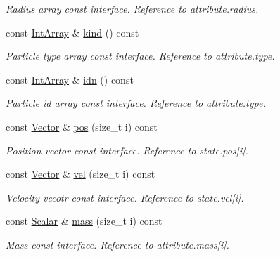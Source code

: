 \begin{DoxyCompactItemize}
\begin{DoxyCompactList}\small\item\em Radius array const interface. Reference to attribute.\+radius. \end{DoxyCompactList}\item 
const \mbox{\hyperlink{classparticle_system_aea9c70dc1a9d1947b425f5383fb21e24}{Int\+Array}} \& \mbox{\hyperlink{classparticle_system_a5b41ae458724a13976117216fdf63b19}{kind}} () const
\begin{DoxyCompactList}\small\item\em Particle type array const interface. Reference to attribute.\+type. \end{DoxyCompactList}\item 
const \mbox{\hyperlink{classparticle_system_aea9c70dc1a9d1947b425f5383fb21e24}{Int\+Array}} \& \mbox{\hyperlink{classparticle_system_a551d6833ec7b1f42a0d2c6b8ad0b3ddb}{idn}} () const
\begin{DoxyCompactList}\small\item\em Particle id array const interface. Reference to attribute.\+type. \end{DoxyCompactList}\item 
const \mbox{\hyperlink{classparticle_system_a76c99c2b05db108a24c6e6ccbbd93af1}{Vector}} \& \mbox{\hyperlink{classparticle_system_ae18ea167d5145d52067ae6661a416c4c}{pos}} (size\+\_\+t i) const
\begin{DoxyCompactList}\small\item\em Position vector const interface. Reference to state.\+pos\mbox{[}i\mbox{]}. \end{DoxyCompactList}\item 
const \mbox{\hyperlink{classparticle_system_a76c99c2b05db108a24c6e6ccbbd93af1}{Vector}} \& \mbox{\hyperlink{classparticle_system_a2557b0120e0e892da7e8903551784157}{vel}} (size\+\_\+t i) const
\begin{DoxyCompactList}\small\item\em Velocity vecotr const interface. Reference to state.\+vel\mbox{[}i\mbox{]}. \end{DoxyCompactList}\item 
const \mbox{\hyperlink{classparticle_system_a3938954186247e3eab01cc75fcc62b40}{Scalar}} \& \mbox{\hyperlink{classparticle_system_a1bbc12a8ac1923956f409e6f66cdc12d}{mass}} (size\+\_\+t i) const
\begin{DoxyCompactList}\small\item\em Mass const interface. Reference to attribute.\+mass\mbox{[}i\mbox{]}. \end{DoxyCompactList}\item 

\end{DoxyCompactItemize}
